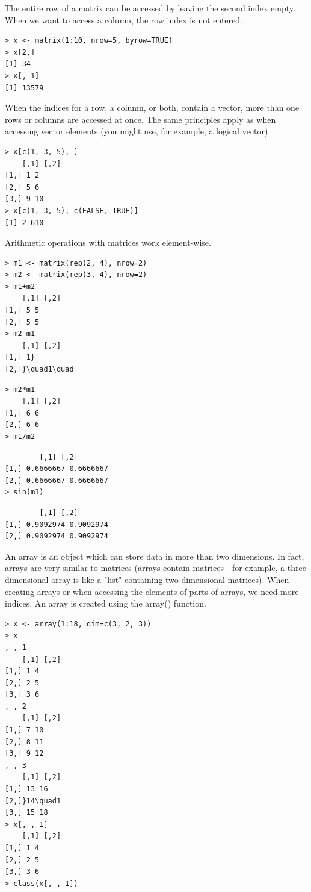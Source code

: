 \documentclass[10pt]{book}
\begin{document}
The entire row of a matrix can be accessed by leaving the second index empty. When we want to access a column, the row index is not entered.

\begin{verbatim}
> x <- matrix(1:10, nrow=5, byrow=TRUE)
> x[2,]
[1] 34
> x[, 1]
[1] 13579
\end{verbatim}

When the indices for a row, a column, or both, contain a vector, more than one rows or columns are accessed at once. The same principles apply as when accessing vector elements (you might use, for example, a logical vector).

\begin{verbatim}
> x[c(1, 3, 5), ]
    [,1] [,2]
[1,] 1 2
[2,] 5 6
[3,] 9 10
> x[c(1, 3, 5), c(FALSE, TRUE)]
[1] 2 610
\end{verbatim}

Arithmetic operations with matrices work element-wise.

\begin{verbatim}
> m1 <- matrix(rep(2, 4), nrow=2)
> m2 <- matrix(rep(3, 4), nrow=2)
> m1+m2
    [,1] [,2]
[1,] 5 5
[2,] 5 5
> m2-m1
    [,1] [,2]
[1,] 1}
[2,]}\quad1\quad
\end{verbatim}

\begin{verbatim}
> m2*m1
    [,1] [,2]
[1,] 6 6
[2,] 6 6
> m1/m2
\end{verbatim}

\begin{verbatim}
        [,1] [,2]
[1,] 0.6666667 0.6666667
[2,] 0.6666667 0.6666667
> sin(m1)
\end{verbatim}

\begin{verbatim}
        [,1] [,2]
[1,] 0.9092974 0.9092974
[2,] 0.9092974 0.9092974
\end{verbatim}

An array is an object which can store data in more than two dimensions. In fact, arrays are very similar to matrices (arrays contain matrices - for example, a three dimensional array is like a "list" containing two dimensional matrices). When creating arrays or when accessing the elements of parts of arrays, we need more indices. An array is created using the array() function.

\begin{verbatim}
> x <- array(1:18, dim=c(3, 2, 3))
> x
, , 1
    [,1] [,2]
[1,] 1 4
[2,] 2 5
[3,] 3 6
, , 2
    [,1] [,2]
[1,] 7 10
[2,] 8 11
[3,] 9 12
, , 3
    [,1] [,2]
[1,] 13 16
[2,]}14\quad1
[3,] 15 18
> x[, , 1]
    [,1] [,2]
[1,] 1 4
[2,] 2 5
[3,] 3 6
> class(x[, , 1])
\end{verbatim}
\end{document}
